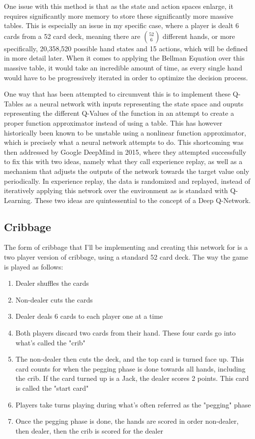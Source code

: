 \documentclass[]{article}
\begin{document}
One issue with this method is that as the state and action spaces enlarge, it requires significantly more memory to store these significantly more massive tables. This is especially an issue in my specific case, where a player is dealt 6 cards from a 52 card deck, meaning there are $52\choose{6}$ different hands, or more specifically, 20,358,520 possible hand states and 15 actions, which will be defined in more detail later. When it comes to applying the Bellman Equation over this massive table, it would take an incredible amount of time, as every single hand would have to be progressively iterated in order to optimize the decision process.

One way that has been attempted to circumvent this is to implement these Q-Tables as a neural network with inputs representing the state space and ouputs representing the different Q-Values of the function in an attempt to create a proper function approximator instead of using a table. This has however historically been known to be unstable using a nonlinear function approximator, which is precisely what a neural network attempts to do\cite{temp_diff_analysis}. This shortcoming was then addressed by Google DeepMind in 2015, where they attempted successfully to fix this with two ideas, namely what they call experience replay, as well as a mechanism that adjusts the outputs of the network towards the target value only periodically\cite{deepmind_2015}. In experience replay, the data is randomized and replayed, instead of iteratively applying this network over the environment as is standard with Q-Learning. These two ideas are quintessential to the concept of a Deep Q-Network\cite{drl_survey}.

\subsection{Cribbage}

The form of cribbage that I'll be implementing and creating this network for is a two player version of cribbage, using a standard 52 card deck. The way the game is played as follows:

\begin{enumerate}
    \item Dealer shuffles the cards 
    \item Non-dealer cuts the cards 
    \item Dealer deals 6 cards to each player one at a time 
    \item Both players discard two cards from their hand. These four cards go into what's called the "crib"
    \item The non-dealer then cuts the deck, and the top card is turned face up. This card counts for when the pegging phase is done towards all hands, including the crib. If the card turned up is a Jack, the dealer scores 2 points. This card is called the "start card"
    \item Players take turns playing during what's often referred as the "pegging" phase 
    \item Once the pegging phase is done, the hands are scored in order non-dealer, then dealer, then the crib is scored for the dealer
\end{enumerate}
\end{document}
